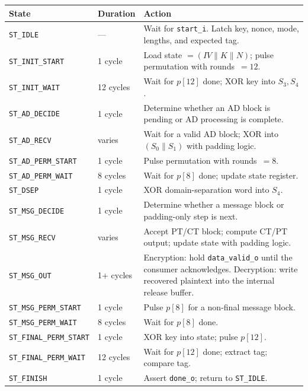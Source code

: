 \documentclass[11pt,a4paper]{article}
\newcommand{\thead}[1]{\cellcolor{tabhead}\color{white}\textbf{\small #1}}
\begin{document}
\begin{tabular}{@{}L{3.8cm}L{2cm}L{7.5cm}@{}}
  \toprule
  \thead{State} & \thead{Duration} & \thead{Action} \\
  \midrule
  \texttt{ST\_IDLE}             & ---      & Wait for \texttt{start\_i}. Latch key, nonce, mode, lengths, and expected tag. \\
  \texttt{ST\_INIT\_START}      & 1 cycle  & Load state $= (IV \| K \| N)$; pulse permutation with rounds~$= 12$. \\
  \texttt{ST\_INIT\_WAIT}       & 12 cycles & Wait for $p[12]$ done; XOR key into $S_3, S_4$. \\
  \texttt{ST\_AD\_DECIDE}       & 1 cycle  & Determine whether an AD block is pending or AD processing is complete. \\
  \texttt{ST\_AD\_RECV}         & varies   & Wait for a valid AD block; XOR into $(S_0 \| S_1)$ with padding logic. \\
  \texttt{ST\_AD\_PERM\_START}  & 1 cycle  & Pulse permutation with rounds~$= 8$. \\
  \texttt{ST\_AD\_PERM\_WAIT}   & 8 cycles & Wait for $p[8]$ done; update state register. \\
  \texttt{ST\_DSEP}             & 1 cycle  & XOR domain-separation word into $S_4$. \\
  \texttt{ST\_MSG\_DECIDE}      & 1 cycle  & Determine whether a message block or padding-only step is next. \\
  \texttt{ST\_MSG\_RECV}        & varies   & Accept PT/CT block; compute CT/PT output; update state with padding logic. \\
  \texttt{ST\_MSG\_OUT}         & 1+ cycles & Encryption: hold \texttt{data\_valid\_o} until the consumer acknowledges. Decryption: write recovered plaintext into the internal release buffer. \\
  \texttt{ST\_MSG\_PERM\_START} & 1 cycle  & Pulse $p[8]$ for a non-final message block. \\
  \texttt{ST\_MSG\_PERM\_WAIT}  & 8 cycles & Wait for $p[8]$ done. \\
  \texttt{ST\_FINAL\_PERM\_START} & 1 cycle & XOR key into state; pulse $p[12]$. \\
  \texttt{ST\_FINAL\_PERM\_WAIT}  & 12 cycles & Wait for $p[12]$ done; extract tag; compare tag. \\
  \texttt{ST\_FINISH}           & 1 cycle  & Assert \texttt{done\_o}; return to \texttt{ST\_IDLE}. \\
  \bottomrule
\end{tabular}
\end{document}
